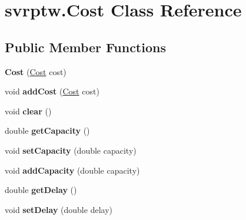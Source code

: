 \hypertarget{classsvrptw_1_1_cost}{}\section{svrptw.\+Cost Class Reference}
\label{classsvrptw_1_1_cost}
\subsection*{Public Member Functions}
\begin{DoxyCompactItemize}
\item 
{\bfseries Cost} (\hyperlink{classsvrptw_1_1_cost}{Cost} cost)\hypertarget{classsvrptw_1_1_cost_a2f8ff22ef001cbf9be3b962eeb9db3e1}{}\label{classsvrptw_1_1_cost_a2f8ff22ef001cbf9be3b962eeb9db3e1}

\item 
void {\bfseries add\+Cost} (\hyperlink{classsvrptw_1_1_cost}{Cost} cost)\hypertarget{classsvrptw_1_1_cost_a8140800b0efa04a4d076130607bb374f}{}\label{classsvrptw_1_1_cost_a8140800b0efa04a4d076130607bb374f}

\item 
void {\bfseries clear} ()\hypertarget{classsvrptw_1_1_cost_a3e7dc700fec0b3978aefcf84e92be3e4}{}\label{classsvrptw_1_1_cost_a3e7dc700fec0b3978aefcf84e92be3e4}

\item 
double {\bfseries get\+Capacity} ()\hypertarget{classsvrptw_1_1_cost_a5e9304d068fb04fe6bc994dfbe08f3b4}{}\label{classsvrptw_1_1_cost_a5e9304d068fb04fe6bc994dfbe08f3b4}

\item 
void {\bfseries set\+Capacity} (double capacity)\hypertarget{classsvrptw_1_1_cost_a1547230e2953208392f6c545d209a189}{}\label{classsvrptw_1_1_cost_a1547230e2953208392f6c545d209a189}

\item 
void {\bfseries add\+Capacity} (double capacity)\hypertarget{classsvrptw_1_1_cost_aceb52b36c9500c5a08e3c43986f06a0b}{}\label{classsvrptw_1_1_cost_aceb52b36c9500c5a08e3c43986f06a0b}

\item 
double {\bfseries get\+Delay} ()\hypertarget{classsvrptw_1_1_cost_ab687c7084a522667350592b207d0914a}{}\label{classsvrptw_1_1_cost_ab687c7084a522667350592b207d0914a}

\item 
void {\bfseries set\+Delay} (double delay)\hypertarget{classsvrptw_1_1_cost_ac43ca2ea513653deb77aacc09da2636e}{}\label{classsvrptw_1_1_cost_ac43ca2ea513653deb77aacc09da2636e}


\end{DoxyCompactItemize}
